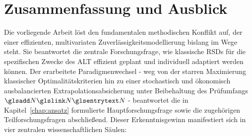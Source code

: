 
\chapter{Zusammenfassung und Ausblick} \label{chap:fazit}

Die vorliegende Arbeit löst den fundamentalen methodischen Konflikt auf, der einer effizienten, multivariaten Zuverlässigkeitsmodellierung bislang im Wege steht.
Sie beantwortet die zentrale Forschungsfrage, wie klassische \acp{RSD} für die spezifischen Zwecke des \ac{ALT} effizient geplant und individuell adaptiert werden können.
Der erarbeitete Paradigmenwechsel - weg von der starren Maximierung klassischer Optimalitätskriterien hin zu einer stochastisch und ökonomisch ausbalancierten Extrapolationsabsicherung unter Beibehaltung des Prüfumfangs $\sym{N}$ - beantwortet die in Kapitel~\ref{chap:ansatz} formulierte Hauptforschungsfrage sowie die zugehörigen Teilforschungsfragen abschließend.
Dieser Erkenntnisgewinn manifestiert sich in vier zentralen wissenschaftlichen Säulen:

